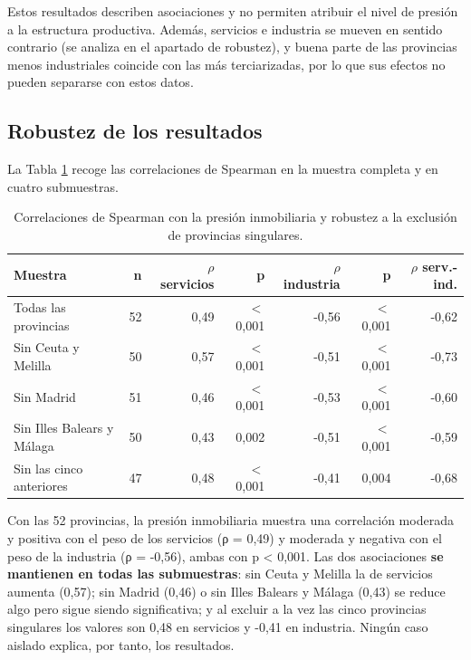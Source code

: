 \documentclass[econometrics,article,submit,moreauthors,pdftex]{Definitions/mdpi}
\begin{document}
Estos resultados describen asociaciones y no permiten atribuir el nivel
de presión a la estructura productiva. Además, servicios e industria se
mueven en sentido contrario (se analiza en el apartado de robustez), y
buena parte de las provincias menos industriales coincide con las más
terciarizadas, por lo que sus efectos no pueden separarse con estos
datos.

\subsection{Robustez de los
resultados}\label{robustez-de-los-resultados}

La Tabla \ref{tab:tabrobustez} recoge las correlaciones de Spearman en
la muestra completa y en cuatro submuestras.

\begin{table}[H]
\centering
\caption{\label{tab:tabrobustez}Correlaciones de Spearman con la presión inmobiliaria y robustez a la exclusión de provincias singulares.}
\centering
\fontsize{8}{10}\selectfont
\begin{tabular}[t]{lrrrrrr}
\toprule
Muestra & n & $\rho$ servicios & p  & $\rho$ industria & p & $\rho$ serv.-ind.\\
\midrule
Todas las provincias & 52 & 0,49 & $<$0,001 & -0,56 & $<$0,001 & -0,62\\
Sin Ceuta y Melilla & 50 & 0,57 & $<$0,001 & -0,51 & $<$0,001 & -0,73\\
Sin Madrid & 51 & 0,46 & $<$0,001 & -0,53 & $<$0,001 & -0,60\\
Sin Illes Balears y Málaga & 50 & 0,43 & 0,002 & -0,51 & $<$0,001 & -0,59\\
Sin las cinco anteriores & 47 & 0,48 & $<$0,001 & -0,41 & 0,004 & -0,68\\
\bottomrule
\end{tabular}
\end{table}

Con las 52 provincias, la presión inmobiliaria muestra una correlación
moderada y positiva con el peso de los servicios (ρ = 0,49) y moderada y
negativa con el peso de la industria (ρ = -0,56), ambas con p
\textless{} 0,001. Las dos asociaciones \textbf{se mantienen en todas
las submuestras}: sin Ceuta y Melilla la de servicios aumenta (0,57);
sin Madrid (0,46) o sin Illes Balears y Málaga (0,43) se reduce algo
pero sigue siendo significativa; y al excluir a la vez las cinco
provincias singulares los valores son 0,48 en servicios y -0,41 en
industria. Ningún caso aislado explica, por tanto, los resultados.
\end{document}
